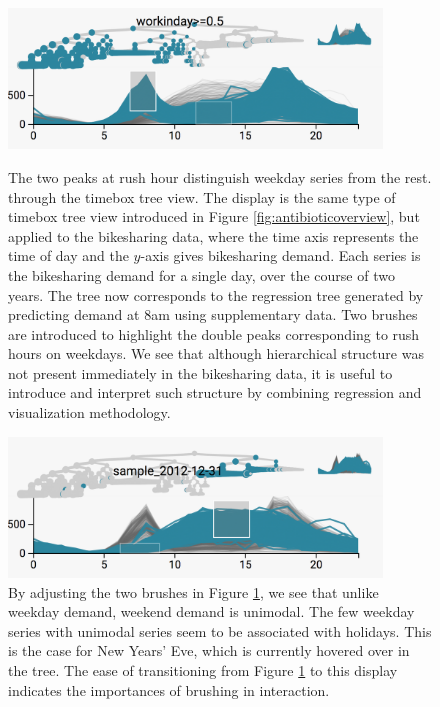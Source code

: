 \documentclass{report}
\begin{document}
\begin{figure}
{\centering \includegraphics[width=375px]{figure/treelapse/working}}
\caption{The two peaks at rush hour distinguish weekday series from the rest.
  through the timebox tree view. The display is the same type of timebox tree
  view introduced in Figure \ref{fig:antibioticoverview}, but applied to the
  bikesharing data, where the time axis represents the time of day and the
  $y$-axis gives bikesharing demand. Each series is the bikesharing demand for a
  single day, over the course of two years. The tree now corresponds to the
  regression tree generated by predicting demand at 8am using supplementary
  data. Two brushes are introduced to highlight the double peaks corresponding
  to rush hours on weekdays. We see that although hierarchical structure was not
  present immediately in the bikesharing data, it is useful to introduce and
  interpret such structure by combining regression and visualization
  methodology.
}\label{fig:working}
\end{figure}

\begin{figure}
  \centering
  \includegraphics[width=375px]{figure/treelapse/weekend}
    \caption{By adjusting the two brushes in Figure \ref{fig:working}, we see that
      unlike weekday demand, weekend demand is unimodal. The few weekday series with
      unimodal series seem to be associated with holidays. This is the case for New
      Years' Eve, which is currently hovered over in the tree. The ease of
      transitioning from Figure \ref{fig:working} to this display indicates the
      importances of brushing in interaction.}\label{fig:weekend}
\end{figure}
\end{document}
